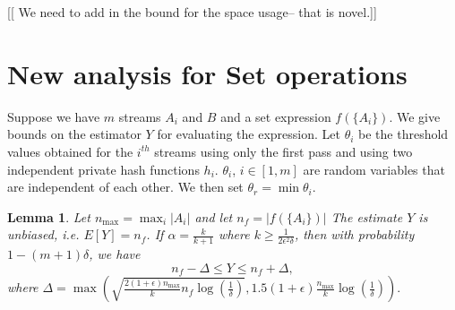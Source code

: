 \documentclass{sig-alternate}
\newtheorem{lemma}[theorem]{Lemma}
\begin{document}
[[ We need to add in the bound for the space usage-- that is novel.]]


\section{New analysis for Set operations}
\def\bad{\mathsf{bad}}
Suppose we have $m$ streams $A_i$ and $B$ and a set expression $f(\{A_i\})$.
We give bounds on the estimator $Y$ for evaluating the expression. Let $\theta_i$ 
be the threshold values obtained for the $i^{th}$ streams using only the first pass and using two independent private hash functions $h_i$. $\theta_i$, $i\in [1,m]$ are random variables that are independent of each other. We then set $\theta_{r} = \min \theta_i$.


\begin{lemma}
	Let $n_{\max} = \max_i |A_i|$ and let $n_f = |f(\{A_i\})| $
	The estimate $Y$ is unbiased, i.e. $E[Y] = n_f $. 
	If $\alpha = \frac{k}{k+1}$ where $k \ge \frac{1}{2\epsilon^2 \delta}$, then with probability $ 1 - (m+1)\delta$, we have
	$$ n_f - \Delta \le Y \le n_f + \Delta, $$ where $\Delta = \max(\sqrt{\frac{2(1 + \epsilon)n_{\max}}{k}n_f\log(\frac{1}{\delta})}, 1.5(1 + \epsilon)\frac{n_{\max}}{k}\log(\frac{1}{\delta})).$
\end{lemma}
\end{document}
